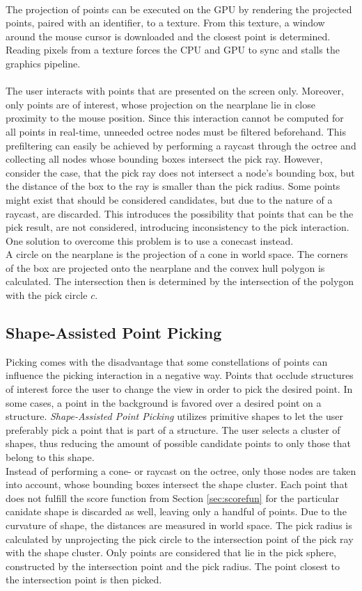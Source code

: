 \\
The projection of points can be executed on the GPU by rendering the projected points, paired with an identifier, to a texture. From this texture, a window around the mouse cursor is downloaded and the closest point is determined. Reading pixels from a texture forces the CPU and GPU to sync and stalls the graphics pipeline. 
\\
\\
The user interacts with points that are presented on the screen only. Moreover, only points are of interest, whose projection on the nearplane lie in close proximity to the mouse position. Since this interaction cannot be computed for all points in real-time, unneeded octree nodes must be filtered beforehand. This prefiltering can easily be achieved by performing a raycast through the octree and collecting all nodes whose bounding boxes intersect the pick ray. However, consider the case, that the pick ray does not intersect a node's bounding box, but the distance of the box to the ray is smaller than the pick radius. Some points might exist that should be considered candidates, but due to the nature of a raycast, are discarded. This introduces the possibility that points that can be the pick result, are not considered, introducing inconsistency to the pick interaction. One solution to overcome this problem is to use a conecast instead. 
\\
A circle on the nearplane is the projection of a cone in world space. The corners of the box are projected onto the nearplane and the convex hull polygon is calculated. The intersection then is determined by the intersection of the polygon with the pick circle $c$. 




\subsection{Shape-Assisted Point Picking}
Picking comes with the disadvantage that some constellations of points can influence the picking interaction in a negative way. Points that occlude structures of interest force the user to change the view in order to pick the desired point. In some cases, a point in the background is favored over a desired point on a structure. 
 \textit{Shape-Assisted Point Picking} utilizes primitive shapes to let the user preferably pick a point that is part of a structure. The user selects a cluster of shapes, thus reducing the amount of possible candidate points to only those that belong to this shape. 
\\
Instead of performing a cone- or raycast on the octree, only those nodes are taken into account, whose bounding boxes intersect the shape cluster. Each point that does not fulfill the score function from Section \ref{sec:scorefun} for the particular canidate shape is discarded as well, leaving only a handful of points. Due to the curvature of shape, the distances are measured in world space. The pick radius is calculated by unprojecting the pick circle to the intersection point of the pick ray with the shape cluster. Only points are considered that lie in the pick sphere, constructed by the intersection point and the pick radius. The point closest to the intersection point is then picked. 

